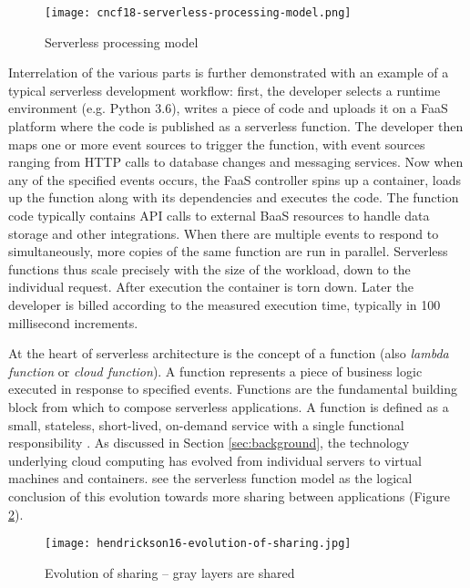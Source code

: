 \begin{figure}[h]
  \centering
  \texttt{[image: cncf18-serverless-processing-model.png]}
  \caption{Serverless processing model \parencite{cncf18serverlessWG}}
  \label{fig:processingModel}
\end{figure}

Interrelation of the various parts is further demonstrated with an example of a typical serverless development workflow: first, the developer selects a runtime environment (e.g. Python 3.6), writes a piece of code and uploads it on a FaaS platform where the code is published as a serverless function. The developer then maps one or more event sources to trigger the function, with event sources ranging from HTTP calls to database changes and messaging services. Now when any of the specified events occurs, the FaaS controller spins up a container, loads up the function along with its dependencies and executes the code. The function code typically contains API calls to external BaaS resources to handle data storage and other integrations. When there are multiple events to respond to simultaneously, more copies of the same function are run in parallel. Serverless functions thus scale precisely with the size of the workload, down to the individual request. After execution the container is torn down. Later the developer is billed according to the measured execution time, typically in 100 millisecond increments. \parencite{awslambda0218}

At the heart of serverless architecture is the concept of a function (also \textit{lambda function} or \textit{cloud function}). A function represents a piece of business logic executed in response to specified events. Functions are the fundamental building block from which to compose serverless applications. A function is defined as a small, stateless, short-lived, on-demand service with a single functional responsibility \parencite{van2017spec}. As discussed in Section \ref{sec:background}, the technology underlying cloud computing has evolved from individual servers to virtual machines and containers. \textcite{hendrickson16openlambda} see the serverless function model as the logical conclusion of this evolution towards more sharing between applications (Figure \ref{fig:evolutionOfSharing}).

\begin{figure}[h]
  \centering
  \texttt{[image: hendrickson16-evolution-of-sharing.jpg]}
  \caption{Evolution of sharing -- gray layers are shared \parencite{hendrickson16openlambda}}
  \label{fig:evolutionOfSharing}
\end{figure}

